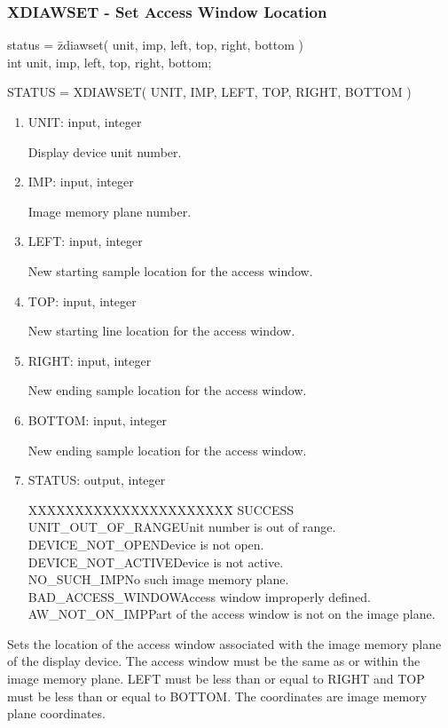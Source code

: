 \subsubsection{XDIAWSET - Set Access Window Location}
\begin{tabbing}
status = \=zdiawset( unit, imp, left, top, right, bottom )\\
\>int  unit, imp, left, top, right, bottom;\\
\end{tabbing}
STATUS = XDIAWSET( UNIT, IMP, LEFT, TOP, RIGHT, BOTTOM )
\begin{enumerate}
\item UNIT:  input, integer

Display device unit number.
\item IMP:  input, integer

Image memory plane number.
\item LEFT:  input, integer

New starting sample location for the access window.
\item TOP:  input, integer

New starting line location for the access window.
\item RIGHT:  input, integer

New ending sample location for the access window.
\item BOTTOM:  input, integer

New ending sample location for the access window.
\item STATUS:  output, integer
\begin{tabbing}
XXXXXXXXXXXXXXXXXXXXXX\=\kill
SUCCESS\\
UNIT\_OUT\_OF\_RANGE\>Unit number is out of range.\\
DEVICE\_NOT\_OPEN\>Device is not open.\\
DEVICE\_NOT\_ACTIVE\>Device is not active.\\
NO\_SUCH\_IMP\>No such image memory plane.\\
BAD\_ACCESS\_WINDOW\>Access window improperly defined.\\
AW\_NOT\_ON\_IMP\>Part of the access window is not on the image plane.\\
\end{tabbing}
\end{enumerate}
Sets the location of the access window associated with the image
memory plane of the display device.  The access window must be the
same as or within the image memory plane.  LEFT must be less than or
equal to RIGHT and TOP must be less than or equal to BOTTOM.  The
coordinates are image memory plane coordinates.
\newpage
